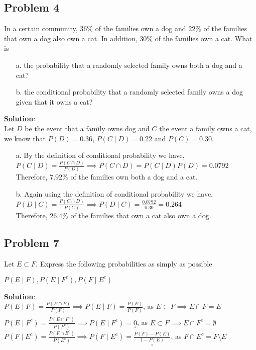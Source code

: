 \documentclass[11pt,letter paper]{report}
\begin{document}
\subsection*{Problem 4}
In a certain community, $36\%$ of the families own a dog and $22\%$ of the families that own a dog also own a cat. In addition, $30\%$ of the families own a cat. What is
\begin{itemize}
\item[a.] the probability that a randomly selected family owns both a dog and a cat?
\item[b.] the conditional probability that a randomly selected family owns a dog given that it owns a cat?
\end{itemize}
{\bf \underline{Solution}}:\\
Let $D$ be the event that a family owns dog and $C$ the event a family owns a cat, we know that $P(D)=0.36$, $P(C\mid D)=0.22$ and $P(C)=0.30$. 
\begin{itemize}
\item[a.] By the definition of conditional probability we have,\\
$P(C\mid D)=\frac{P(C\cap D)}{P(D)}\implies P(C\cap D)=P(C\mid D)P(D)=0.0792$\\
Therefore, \underline{\underline{$7.92\%$}} of the families own both a dog and a cat.
\item[b.] Again using the definition of conditional probability we have,\\
$P(D\mid C)=\frac{P(C\cap D)}{P(C)}\implies P(D\mid C)=\frac{0.0792}{0.30}=0.264$\\
Therefore, \underline{\underline{$26.4\%$}} of the families that own a cat also own a dog.
\end{itemize}

\subsection*{Problem 7}
Let $E\subset F$. Express the following probabilities as simply as possible
\begin{center}
$P(E\mid F), P(E\mid F^c), P(F\mid E^c)$
\end{center}
{\bf \underline{Solution}}:\\
$P(E\mid F)=\frac{P(E\cap F)}{P(F)}\implies P(E\mid F)=\underline{\underline{\frac{P(E)}{P(F)}}}$, as $E\subset F\implies E\cap F=E$\\
$P(E\mid F^c)=\frac{P(E\cap F^c)}{P(F^c)}\implies P(E\mid F^c)=\underline{\underline{0}}$, as $E\subset F\implies E\cap F^c=\emptyset$\\
$P(F\mid E^c)=\frac{P(F\cap E^c)}{P(E^c)}\implies P(F\mid E^c)=\underline{\underline{\frac{P(F)-P(E)}{1-P(E)}}}$, as $F\cap E^c= F\setminus E$
\end{document}
